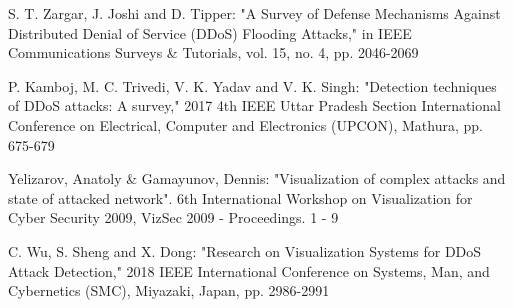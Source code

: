 \begin{thebibliography}{99}

 S. T. Zargar, J. Joshi and D. Tipper: "A Survey of Defense Mechanisms Against Distributed Denial of Service (DDoS) Flooding Attacks," in IEEE Communications Surveys \& Tutorials, vol. 15, no. 4, pp. 2046-2069

 P. Kamboj, M. C. Trivedi, V. K. Yadav and V. K. Singh: "Detection techniques of DDoS attacks: A survey," 2017 4th IEEE Uttar Pradesh Section International Conference on Electrical, Computer and Electronics (UPCON), Mathura,  pp. 675-679

 Yelizarov, Anatoly \& Gamayunov, Dennis: "Visualization of complex attacks and state of attacked network". 6th International Workshop on Visualization for Cyber Security 2009, VizSec 2009 - Proceedings. 1 - 9

 C. Wu, S. Sheng and X. Dong: "Research on Visualization Systems for DDoS Attack Detection," 2018 IEEE International Conference on Systems, Man, and Cybernetics (SMC), Miyazaki, Japan, pp. 2986-2991


\end{thebibliography}
